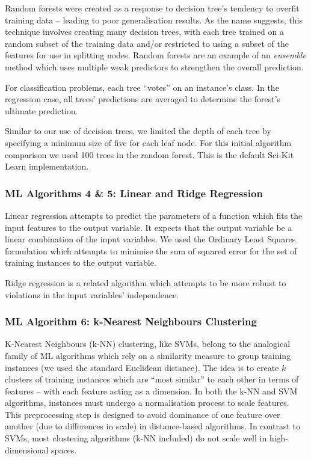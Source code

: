 Random forests \cite{RandomForests} were created as a response to decision tree's tendency to overfit training data -- leading to poor generalisation results.
As the name suggests, this technique involves creating many decision trees, with each tree trained on a random subset of the training data and/or restricted to using a subset of the features for use in splitting nodes.
Random forests are an example of an \textit{ensemble} method which uses multiple weak predictors to strengthen the overall prediction.

For classification problems, each tree ``votes'' on an instance's class.
In the regression case, all trees' predictions are averaged to determine the forest's ultimate prediction.   

Similar to our use of decision trees, we limited the depth of each tree by specifying a minimum size of five for each leaf node. 
For this initial algorithm comparison we used 100 trees in the random forest. 
This is the default Sci-Kit Learn implementation.

\subsubsection{ML Algorithms 4 \& 5: Linear and Ridge Regression} 

Linear regression attempts to predict the parameters of a function which fits the input features to the output variable. 
It expects that the output variable be a linear combination of the input variables.
We used the Ordinary Least Squares formulation which attempts to minimise the sum of squared error for the set of training instances to the output variable.    

Ridge regression \cite{ridge} is a related algorithm which attempts to be more robust to violations in the input variables' independence. 

\subsubsection{ML Algorithm 6: k-Nearest Neighbours Clustering}

K-Nearest Neighbours (k-NN) clustering, like SVMs, belong to the analogical family of ML algorithms which rely on a similarity measure to group training instances (we used the standard Euclidean distance).
The idea is to create $k$ clusters of training instances which are ``most similar'' to each other in terms of features -- with each feature acting as a dimension.   
In both the k-NN and SVM algorithms, instances must undergo a normalisation process to scale features.  
This preprocessing step is designed to avoid dominance of one feature over another (due to differences in scale) in distance-based algorithms.
In contrast to SVMs, most clustering algorithms (k-NN included) do not scale well in high-dimensional spaces.

